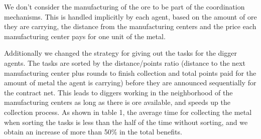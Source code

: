We don’t consider the manufacturing of the ore to be part of the coordination mechanisms. This is handled implicitly by each agent, based on the amount of ore they are carrying, the distance from the manufacturing centers and the price each manufacturing center pays for one unit of the metal.

Additionally we changed the strategy for giving out the tasks for the digger agents. The tasks are sorted by the distance/points ratio (distance to the next manufacturing center plus rounds to finish collection and total points paid for the amount of metal the agent is carrying) before they are announced sequentially for the contract net. This leads to diggers working in the neighborhood of the manufacturing centers as long as there is ore available, and speeds up the collection process. As shown in table 1, the average time for collecting the metal when sorting the tasks is less than the half of the time without sorting, and we obtain an increase of more than 50\% in the total benefits.

